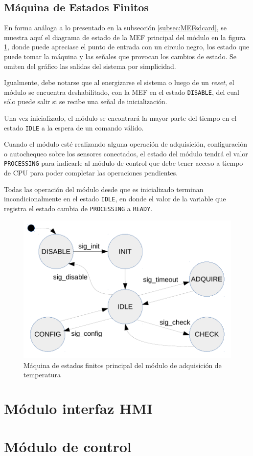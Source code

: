 \subsection{Máquina de Estados Finitos}

En forma análoga a lo presentado en la subsección \ref{subsec:MEFsdcard}, se muestra aquí el diagrama de estado de la MEF principal del módulo en la figura \ref{fig:mef_adquisicion}, donde puede apreciase el punto de entrada con un circulo negro, los estado que puede tomar la máquina y las señales que provocan los cambios de estado. Se omiten del gráfico las salidas del sistema por simplicidad. 

Igualmente, debe notarse que al energizarse el sistema o luego de un \textit{reset}, el módulo se encuentra deshabilitado, con la MEF en el estado \texttt{DISABLE}, del cual sólo puede salir si se recibe una señal de inicialización.  

Una vez inicializado, el módulo se encontrará la mayor parte del tiempo en el estado \texttt{IDLE} a la espera de un comando válido.  

Cuando el módulo esté realizando alguna operación de adquisición, configuración o autochequeo sobre los sensores conectados, el estado del módulo tendrá el valor \texttt{PROCESSING} para indicarle al módulo de control que debe tener acceso a tiempo de CPU para poder completar las operaciones pendientes.  

Todas las operación del módulo desde que es inicializado terminan incondicionalmente en el estado \texttt{IDLE}, en donde el valor de la variable que registra el estado cambia de \texttt{PROCESSING} a \texttt{READY}.

\begin{figure}[htpb]
	\centering
	\includegraphics[width=\textwidth]{./Figures/MEF_adquisicion.pdf}
	\caption[MEF principal del módulo de adquisición de temperatura]{Máquina de estados finitos principal del módulo de adquisición de temperatura}
	\label{fig:mef_adquisicion}
\end{figure}

\section{Módulo interfaz HMI}
\label{sec:HMI}

\section{Módulo de control}
\label{control}
